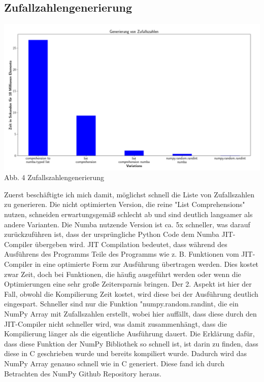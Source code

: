 \documentclass[10pt,a4paper]{article}
\begin{document}
\subsection{Zufallzahlengenerierung}

\begin{center}
    \hspace*{-1.5cm}\includegraphics[width=1.2\textwidth]{./diagramme/matplotlib/zufallszahlen.png}
    Abb. 4 Zufallszahlengenerierung
\end{center}

Zuerst beschäftigte ich mich damit, möglichst schnell die Liste von Zufallszahlen zu generieren.
Die nicht optimierten Version, die reine "List Comprehensions" nutzen, schneiden erwartungsgemäß schlecht ab
und sind deutlich langsamer als andere Varianten. Die Numba nutzende Version ist ca. 5x schneller,
was darauf zurückzuführen ist, dass der ursprüngliche Python Code dem Numba JIT-Compiler übergeben wird.
JIT Compilation bedeutet, dass während des Ausführens des Programms Teile des Programms wie z. B. Funktionen
vom JIT-Compiler in eine optimierte Form zur Ausführung übertragen werden. Dies kostet zwar Zeit, doch bei
Funktionen, die häufig ausgeführt werden oder wenn die Optimierungen eine sehr große Zeitersparnis bringen.
Der 2. Aspekt ist hier der Fall, obwohl die Kompilierung Zeit kostet, wird diese bei der Ausführung deutlich eingespart.
Schneller sind nur die Funktion "numpy.random.randint, die ein NumPy Array mit Zufallszahlen erstellt,
wobei hier auffällt, dass diese durch den JIT-Compiler nicht schneller wird, was damit zusammenhängt, dass die Kompilierung
länger als die eigentliche Ausführung dauert. Die Erklärung dafür, dass diese Funktion der NumPy Bibliothek
so schnell ist, ist darin zu finden, dass diese in C geschrieben wurde und bereits kompiliert wurde. Dadurch wird
das NumPy Array genauso schnell wie in C generiert. Diese fand ich durch Betrachten des NumPy Github Repository heraus.
\end{document}
